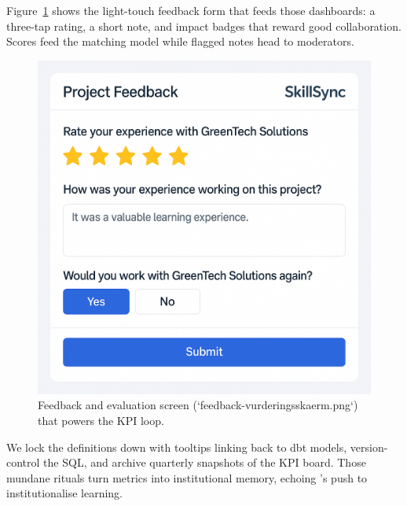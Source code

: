 Figure~\ref{fig:feedback-screen} shows the light-touch feedback form that feeds those dashboards: a three-tap rating, a short note, and impact badges that reward good collaboration. Scores feed the matching model while flagged notes head to moderators.

\begin{figure}[h]
  \centering
  \includegraphics[width=0.8\linewidth]{figures/opgave08/feedback-vurderingsskaerm.png}
  \caption{Feedback and evaluation screen (`feedback-vurderingsskaerm.png`) that powers the KPI loop.}
  \label{fig:feedback-screen}
\end{figure}

We lock the definitions down with tooltips linking back to dbt models, version-control the SQL, and archive quarterly snapshots of the KPI board. Those mundane rituals turn metrics into institutional memory, echoing \citet{Choudary2016}'s push to institutionalise learning.

